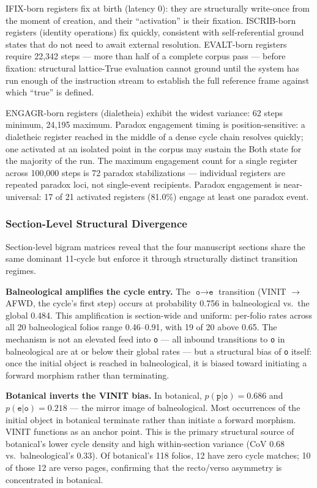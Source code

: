 \documentclass[12pt,a4paper]{article}
\begin{document}
IFIX-born registers fix at birth (latency 0): they are structurally write-once from the moment of creation, and their ``activation'' is their fixation. ISCRIB-born registers (identity operations) fix quickly, consistent with self-referential ground states that do not need to await external resolution. EVALT-born registers require 22,342 steps --- more than half of a complete corpus pass --- before fixation: structural lattice-True evaluation cannot ground until the system has run enough of the instruction stream to establish the full reference frame against which ``true'' is defined.

ENGAGR-born registers (dialetheia) exhibit the widest variance: 62 steps minimum, 24,195 maximum. Paradox engagement timing is position-sensitive: a dialetheic register reached in the middle of a dense cycle chain resolves quickly; one activated at an isolated point in the corpus may sustain the Both state for the majority of the run. The maximum engagement count for a single register across 100,000 steps is 72 paradox stabilizations --- individual registers are repeated paradox loci, not single-event recipients. Paradox engagement is near-universal: 17 of 21 activated registers (81.0\%) engage at least one paradox event.

\subsubsection{Section-Level Structural Divergence}

Section-level bigram matrices reveal that the four manuscript sections share the same dominant 11-cycle but enforce it through structurally distinct transition regimes.

\textbf{Balneological amplifies the cycle entry.} The $\texttt{o} \to \texttt{e}$ transition (VINIT $\to$ AFWD, the cycle's first step) occurs at probability 0.756 in balneological vs.\ the global 0.484. This amplification is section-wide and uniform: per-folio rates across all 20 balneological folios range 0.46--0.91, with 19 of 20 above 0.65. The mechanism is not an elevated feed into \texttt{o} --- all inbound transitions to \texttt{o} in balneological are at or below their global rates --- but a structural bias of \texttt{o} itself: once the initial object is reached in balneological, it is biased toward initiating a forward morphism rather than terminating.

\textbf{Botanical inverts the VINIT bias.} In botanical, $p(\texttt{p}|\texttt{o}) = 0.686$ and $p(\texttt{e}|\texttt{o}) = 0.218$ --- the mirror image of balneological. Most occurrences of the initial object in botanical terminate rather than initiate a forward morphism. VINIT functions as an anchor point. This is the primary structural source of botanical's lower cycle density and high within-section variance (CoV 0.68 vs.\ balneological's 0.33). Of botanical's 118 folios, 12 have zero cycle matches; 10 of those 12 are verso pages, confirming that the recto/verso asymmetry is concentrated in botanical.
\end{document}

